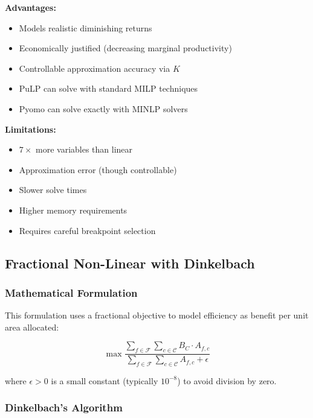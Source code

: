 \documentclass{article}
\begin{document}
\begin{multicols}{2}
\textbf{Advantages:}
\begin{itemize}
    \item Models realistic diminishing returns
    \item Economically justified (decreasing marginal productivity)
    \item Controllable approximation accuracy via $K$
    \item PuLP can solve with standard MILP techniques
    \item Pyomo can solve exactly with MINLP solvers
\end{itemize}
\columnbreak
\textbf{Limitations:}
\begin{itemize}
    \item $7\times$ more variables than linear
    \item Approximation error (though controllable)
    \item Slower solve times
    \item Higher memory requirements
    \item Requires careful breakpoint selection
\end{itemize}
\end{multicols}


\newpage
\subsection{Fractional Non-Linear with Dinkelbach}

\subsubsection{Mathematical Formulation}

This formulation uses a fractional objective to model efficiency as benefit per unit area allocated:

\begin{equation}
\max \frac{\sum_{f \in \mathcal{F}} \sum_{c \in \mathcal{C}} B_C \cdot A_{f,c}}{\sum_{f \in \mathcal{F}} \sum_{c \in \mathcal{C}} A_{f,c} + \epsilon}
\label{eq:fractional_obj}
\end{equation}

where $\epsilon > 0$ is a small constant (typically $10^{-8}$) to avoid division by zero.


\subsubsection{Dinkelbach's Algorithm}
\end{document}
